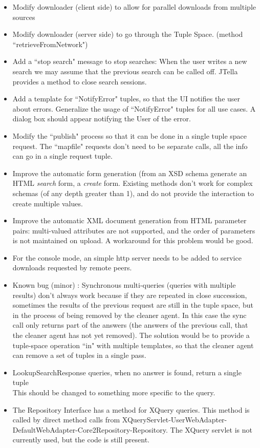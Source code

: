 \documentclass[titlepage]{article}%
\begin{document}
\begin{itemize}
\item Modify downloader (client side) to allow for parallel downloads from multiple sources
\item Modify downloader (server side) to go through the Tuple Space. (method ``retrieveFromNetwork")
\item Add a ``stop search" message to stop searches: When the user writes a new search we may assume that the previous search can be called off. JTella provides a method to close search sessions.
\item Add a template for ``NotifyError" tuples, so that the UI notifies the user about errors. Generalize the usage of ``NotifyError" tuples for all use cases. A dialog box should appear notifying the User of the error.
\item Modify the ``publish" process so that it can be done in a single tuple space request. The ``mapfile" requests don't need to be separate calls, all the info can go in a single request tuple.
\item Improve the automatic form generation (from an XSD schema generate an HTML \emph{search} form, a \emph{create} form. Existing methods don't work for complex schemas (of any depth greater than 1), and do not provide the interaction to create multiple values. 
\item Improve the automatic XML document generation from HTML parameter pairs: multi-valued attributes are not supported, and the order of parameters is not maintained on upload. A workaround for this problem would be good.
\item For the console mode, an simple http server needs to be added to service downloads requested by remote peers.
\item Known bug (minor) : Synchronous multi-queries (queries with multiple results) don't always work because if they are repeated in close succession, sometimes the results of the previous request are still in the tuple space, but in the process of being removed by the cleaner agent. In this case the sync call only returns part of the answers (the answers of the previous call, that the cleaner agent has not yet removed).
The solution would be to provide a tuple-space operation ``in" with multiple templates, so that the cleaner agent can remove a set of tuples in a single pass.
\item LookupSearchResponse queries, when no answer is found, return a single tuple 
\begin{equation*}
[\text{``LookupSearchResponseAnswer"}; \text{``"}]
\end{equation*}
This should be changed to something more specific to the query.
\item The Repository Interface has a method for XQuery queries. This method is called by direct method calls from XQueryServlet-UserWebAdapter-DefaultWebAdapter-Core2Repository-Repository.
The XQuery servlet is not currently used, but the code is still present.


\end{itemize}
\end{document}
